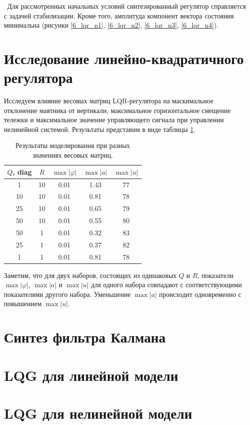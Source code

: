 \newpage
\,
\newpage
Для рассмотренных начальных условий синтезированный регулятор справляется с задачей стабилизации. Кроме того, амплитуда компонент вектора состояния минимальна (рисунки \ref{6_lqr_n1}, \ref{6_lqr_n2}, \ref{6_lqr_n3}, \ref{6_lqr_n4}).

\section{Исследование линейно-квадратичного регулятора}

Исследуем влияние весовых матриц LQR-регулятора на маскимальное отклонение маятника от вертикали, максимальное горизонтальное смещение тележки и максимальное значение управляющего сигнала при управлении нелинейной системой. Результаты представим в виде таблицы \ref{6_tab_1}.

\begin{table}[h]
	\centering
	\caption{Результаты моделирования при разных значениях весовых матриц.}
	\label{6_tab_1}
	\begin{tabular}{ccccc}
		\toprule
		$Q$, diag & $R$ & $\max |\varphi|$ & $\max |a|$ & $\max |u|$ \\
		\midrule
		1  & 10  &  0.01  &  1.43  &  77  \\
		10  & 10 &  0.01  &  0.81  &  78  \\
		25 & 10&  0.01  &  0.65  &  79  \\
		50  &10&   0.01  &  0.55&  80 \\
		50  &1&   0.01  &  0.32 &  83  \\
		25  &1&   0.01  &  0.37 &  82  \\
		1  &1&   0.01  &  0.81 &  78 \\
		\bottomrule
	\end{tabular}
\end{table}

Заметим, что для двух наборов, состоящих из одинаковых $Q$ и $R$, показатели $\max |\varphi|$, $\max |a|$ и $\max |u|$ для одного набора совпадают с соответствующими показателями другого набора. Уменьшение $\max |a|$ происходит одновременно с повышением $\max |u|$.

\section{Синтез фильтра Калмана}


\section{LQG для линейной модели}


\section{LQG для нелинейной модели}


\endinput